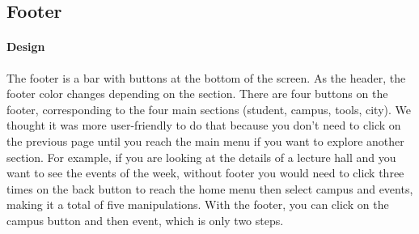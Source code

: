 \documentclass{eplmastersthesis}
\begin{document}
\subsection{Footer}
\paragraph{Design}
The footer is a bar with buttons at the bottom of the screen. As the header, the footer color changes depending on the section. There are four buttons on the footer, corresponding to the four main sections (student, campus, tools, city). We thought it was more user-friendly to do that because you don't need to click on the previous page until you reach the main menu if you want to explore another section. For example, if you are looking at the details of a lecture hall and you want to see the events of the week, without footer you would need to click three times on the back button to reach the home menu then select campus and events, making it a total of five manipulations. With the footer, you can click on the campus button and then event, which is only two steps. 
\end{document}
